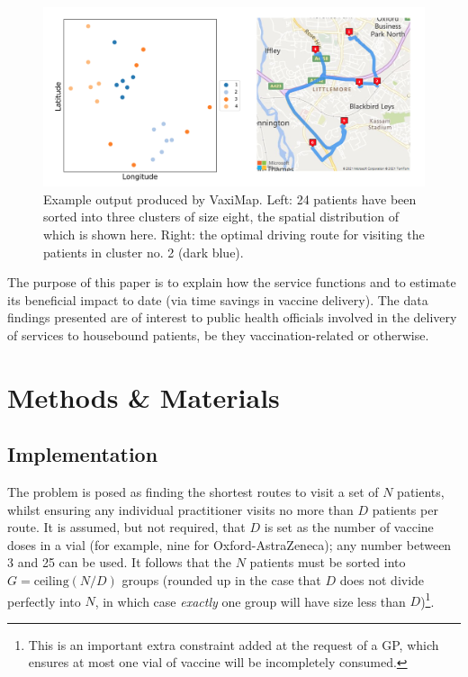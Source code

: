 \documentclass[review]{elsarticle}
\def\vm{VaxiMap}
\begin{document}
\begin{figure}[H]
\centering
\includegraphics[width=\textwidth]{demo.png}
\caption{Example output produced by \vm{}. Left: 24 patients have been sorted into three clusters of size eight, the spatial distribution of which is shown here. Right: the optimal driving route for visiting the patients in cluster no. 2 (dark blue).}
\label{demo}
\end{figure}

The purpose of this paper is to explain how the service functions and to estimate its beneficial impact to date (via time savings in vaccine delivery). The data findings presented are of interest to public health officials involved in the delivery of services to housebound patients, be they vaccination-related or otherwise. 

\section{Methods \& Materials}
\subsection{Implementation}

The problem is posed as finding the shortest routes to visit a set of $N$ patients, whilst ensuring any individual practitioner visits no more than $D$ patients per route. It is assumed, but not required, that $D$ is set as the number of vaccine doses in a vial (for example, nine for Oxford-AstraZeneca); any number between 3 and 25 can be used. It follows that the $N$ patients must be sorted into $G = \mathrm{ceiling}(N/D)$ groups (rounded up in the case that $D$ does not divide perfectly into $N$, in which case \textit{exactly} one group will have size less than $D$)\footnote{This is an important extra constraint added at the request of a GP, which ensures at most one vial of vaccine will be incompletely consumed.}. 
\end{document}
